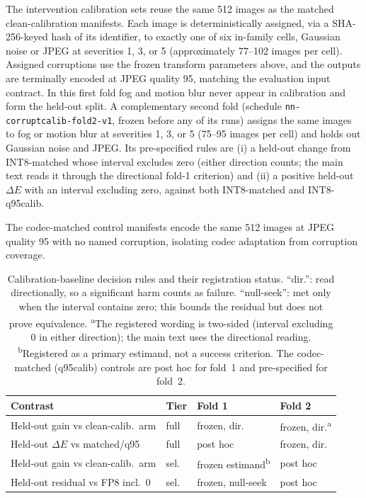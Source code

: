 \documentclass[10pt]{article}
\begin{document}
The intervention calibration sets reuse the same 512 images as the matched
clean-calibration manifests. Each image is deterministically assigned, via a
SHA-256-keyed hash of its identifier, to exactly one of six in-family cells,
Gaussian noise or JPEG at severities 1, 3, or 5 (approximately 77--102 images
per cell). Assigned corruptions use the frozen transform parameters above, and
the outputs are terminally encoded at JPEG quality 95, matching the evaluation
input contract. In this first fold fog and motion blur never appear in
calibration and form the held-out split. A complementary second fold (schedule
\texttt{nn-corruptcalib-fold2-v1}, frozen before any of its runs) assigns the
same images to fog or motion blur at severities 1, 3, or 5 (75--95 images per
cell) and holds out Gaussian noise and JPEG. Its pre-specified rules are
(i) a held-out change from INT8-matched whose interval excludes zero
(either direction counts; the main text reads it through the directional
fold-1 criterion) and
(ii) a positive held-out $\Delta E$ with an interval excluding zero, against
both INT8-matched and INT8-q95calib.

The codec-matched control manifests encode the same 512 images at JPEG
quality 95 with no named corruption, isolating codec adaptation from
corruption coverage.

\begin{table}[h]
\centering\small
\caption{Calibration-baseline decision rules and their registration status.
``dir.'': read directionally, so a significant harm counts as failure.
``null-seek'': met only when the interval contains zero; this bounds the
residual but does not prove equivalence. \textsuperscript{a}The registered
wording is two-sided (interval excluding 0 in either direction); the main text
uses the directional reading. \textsuperscript{b}Registered as a primary
estimand, not a success criterion. The codec-matched (q95calib) controls are
post hoc for fold~1 and pre-specified for fold~2.}
\label{tab:rules}
\begin{tabular}{@{}llll@{}}
\toprule
Contrast & Tier & Fold 1 & Fold 2 \\
\midrule
Held-out gain vs clean-calib.\ arm & full & frozen, dir. & frozen, dir.\textsuperscript{a} \\
Held-out $\Delta E$ vs matched/q95 & full & post hoc & frozen, dir. \\
Held-out gain vs clean-calib.\ arm & sel. & frozen estimand\textsuperscript{b} & post hoc \\
Held-out residual vs FP8 incl.\ 0 & sel. & frozen, null-seek & post hoc \\
\bottomrule
\end{tabular}
\end{table}
\end{document}
